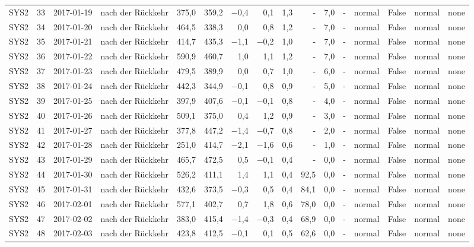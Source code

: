 \begin{tabular}{lrllrrrrrrrrlrll}
SYS2 & 33 & 2017-01-19 & nach der Rückkehr & 375,0 & 359,2 & $-$0,4 & 0,1 & 1,3 & - & 7,0 & - & normal & False & normal & none \\
SYS2 & 34 & 2017-01-20 & nach der Rückkehr & 464,5 & 338,3 & 0,0 & 0,8 & 1,2 & - & 7,0 & - & normal & False & normal & none \\
SYS2 & 35 & 2017-01-21 & nach der Rückkehr & 414,7 & 435,3 & $-$1,1 & $-$0,2 & 1,0 & - & 7,0 & - & normal & False & normal & none \\
SYS2 & 36 & 2017-01-22 & nach der Rückkehr & 590,9 & 460,7 & 1,0 & 1,1 & 1,2 & - & 7,0 & - & normal & False & normal & none \\
SYS2 & 37 & 2017-01-23 & nach der Rückkehr & 479,5 & 389,9 & 0,0 & 0,7 & 1,0 & - & 6,0 & - & normal & False & normal & none \\
SYS2 & 38 & 2017-01-24 & nach der Rückkehr & 442,3 & 344,9 & $-$0,1 & 0,8 & 0,9 & - & 5,0 & - & normal & False & normal & none \\
SYS2 & 39 & 2017-01-25 & nach der Rückkehr & 397,9 & 407,6 & $-$0,1 & $-$0,1 & 0,8 & - & 4,0 & - & normal & False & normal & none \\
SYS2 & 40 & 2017-01-26 & nach der Rückkehr & 509,1 & 375,0 & 0,4 & 1,2 & 0,9 & - & 3,0 & - & normal & False & normal & none \\
SYS2 & 41 & 2017-01-27 & nach der Rückkehr & 377,8 & 447,2 & $-$1,4 & $-$0,7 & 0,8 & - & 2,0 & - & normal & False & normal & none \\
SYS2 & 42 & 2017-01-28 & nach der Rückkehr & 251,0 & 414,7 & $-$2,1 & $-$1,6 & 0,6 & - & 1,0 & - & normal & False & normal & none \\
SYS2 & 43 & 2017-01-29 & nach der Rückkehr & 465,7 & 472,5 & 0,5 & $-$0,1 & 0,4 & - & 0,0 & - & normal & False & normal & none \\
SYS2 & 44 & 2017-01-30 & nach der Rückkehr & 526,2 & 411,1 & 1,4 & 1,1 & 0,4 & 92,5 & 0,0 & - & normal & False & normal & none \\
SYS2 & 45 & 2017-01-31 & nach der Rückkehr & 432,6 & 373,5 & $-$0,3 & 0,5 & 0,4 & 84,1 & 0,0 & - & normal & False & normal & none \\
SYS2 & 46 & 2017-02-01 & nach der Rückkehr & 577,1 & 402,7 & 0,7 & 1,8 & 0,6 & 78,0 & 0,0 & - & normal & False & normal & none \\
SYS2 & 47 & 2017-02-02 & nach der Rückkehr & 383,0 & 415,4 & $-$1,4 & $-$0,3 & 0,4 & 68,9 & 0,0 & - & normal & False & normal & none \\
SYS2 & 48 & 2017-02-03 & nach der Rückkehr & 423,8 & 412,5 & $-$0,1 & 0,1 & 0,5 & 62,6 & 0,0 & - & normal & False & normal & none \\

\end{tabular}
